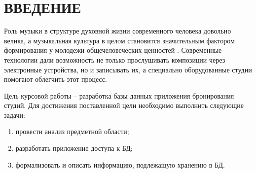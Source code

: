 \chapter*{ВВЕДЕНИЕ}
Роль музыки в структуре духовной жизни современного человека довольно велика, а музыкальная культура в целом становится значительным фактором формирования у молодежи общечеловеческих ценностей \cite{music_for_youth}.
Современные технологии дали возможность не только прослушивать композиции через электронные устройства, но и записывать их, а специально оборудованные студии помогают облегчить этот процесс.

Цель курсовой работы -- разработка базы данных приложения бронирования студий.
Для достижения поставленной цели необходимо выполнить следующие задачи:

\begin{enumerate}
	\item провести анализ предметной области;
	\item разработать приложение доступа к БД;
	\item формализовать и описать информацию, подлежащую хранению в БД.
	
\end{enumerate}